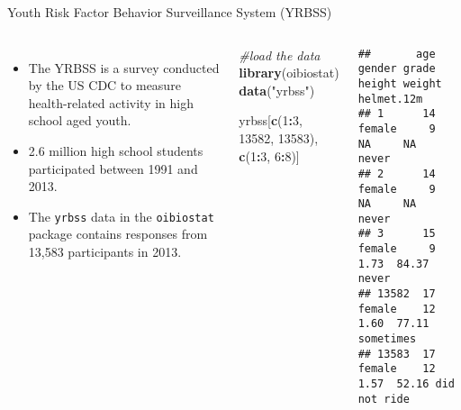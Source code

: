 \documentclass[
  ignorenonframetext,
  aspectratio=169]{beamer}
\newenvironment{Shaded}{\begin{snugshade}}{\end{snugshade}}
\newcommand{\CommentTok}[1]{\textcolor[rgb]{0.56,0.35,0.01}{\textit{#1}}}
\newcommand{\DecValTok}[1]{\textcolor[rgb]{0.00,0.00,0.81}{#1}}
\newcommand{\FunctionTok}[1]{\textcolor[rgb]{0.13,0.29,0.53}{\textbf{#1}}}
\newcommand{\NormalTok}[1]{#1}
\newcommand{\SpecialCharTok}[1]{\textcolor[rgb]{0.81,0.36,0.00}{\textbf{#1}}}
\newcommand{\StringTok}[1]{\textcolor[rgb]{0.31,0.60,0.02}{#1}}
\newcommand{\columnsbegin}{\begin{columns}}
\newcommand{\columnsend}{\end{columns}}
\begin{document}
\begin{frame}[fragile]{Youth Risk Factor Behavior Surveillance System
(YRBSS)}
\protect\hypertarget{youth-risk-factor-behavior-surveillance-system-yrbss}{}
\columnsbegin


\footnotesize

\begin{itemize}
\item
  The YRBSS is a survey conducted by the US CDC to measure
  health-related activity in high school aged youth.
\item
  2.6 million high school students participated between 1991 and 2013.
\item
  The \texttt{yrbss} data in the \texttt{oibiostat} package contains
  responses from 13,583 participants in 2013.
\end{itemize}


\scriptsize

\begin{Shaded}
\begin{Highlighting}[]
\CommentTok{\#load the data}
\FunctionTok{library}\NormalTok{(oibiostat)}
\FunctionTok{data}\NormalTok{(}\StringTok{"yrbss"}\NormalTok{)}

\NormalTok{yrbss[}\FunctionTok{c}\NormalTok{(}\DecValTok{1}\SpecialCharTok{:}\DecValTok{3}\NormalTok{, }\DecValTok{13582}\NormalTok{, }\DecValTok{13583}\NormalTok{), }\FunctionTok{c}\NormalTok{(}\DecValTok{1}\SpecialCharTok{:}\DecValTok{3}\NormalTok{, }\DecValTok{6}\SpecialCharTok{:}\DecValTok{8}\NormalTok{)]}
\end{Highlighting}
\end{Shaded}

\begin{verbatim}
##       age gender grade height weight   helmet.12m
## 1      14 female     9     NA     NA        never
## 2      14 female     9     NA     NA        never
## 3      15 female     9   1.73  84.37        never
## 13582  17 female    12   1.60  77.11    sometimes
## 13583  17 female    12   1.57  52.16 did not ride
\end{verbatim}

\columnsend
\end{frame}
\end{document}
